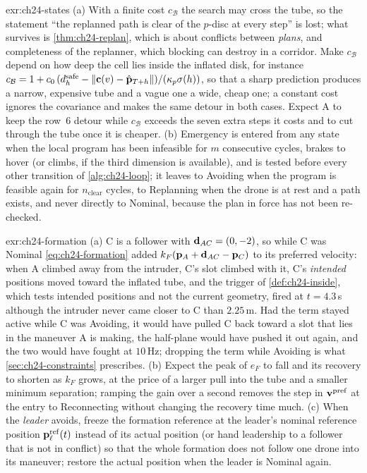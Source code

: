 \begin{solution}{exr:ch24-states}
(a) With a finite cost $c_{\mathcal{B}}$ the search may cross the tube, so the statement ``the replanned path is clear of the $p$-disc at every step'' is lost; what survives is \cref{thm:ch24-replan}, which is about conflicts between \emph{plans}, and completeness of the replanner, which blocking can destroy in a corridor. Make $c_{\mathcal{B}}$ depend on how deep the cell lies inside the inflated disk, for instance $c_{\mathcal{B}} = 1 + c_0\,(d^{\mathrm{safe}}_h - \left\lVert \mathbf{c}(v) - \hat{\mathbf{p}}_{T+h} \right\rVert)/(\kappa_p\sigma(h))$, so that a sharp prediction produces a narrow, expensive tube and a vague one a wide, cheap one; a constant cost ignores the covariance and makes the same detour in both cases. Expect A to keep the row~6 detour while $c_{\mathcal{B}}$ exceeds the seven extra steps it costs and to cut through the tube once it is cheaper. (b) Emergency is entered from any state when the local program has been infeasible for $m$ consecutive cycles, brakes to hover (or climbs, if the third dimension is available), and is tested before every other transition of \cref{alg:ch24-loop}; it leaves to Avoiding when the program is feasible again for $n_{\mathrm{clear}}$ cycles, to Replanning when the drone is at rest and a path exists, and never directly to Nominal, because the plan in force has not been re-checked.
\end{solution}

\begin{solution}{exr:ch24-formation}
(a) C is a follower with $\mathbf{d}_{AC} = (0,-2)$, so while C was Nominal \cref{eq:ch24-formation} added $k_F(\mathbf{p}_A + \mathbf{d}_{AC} - \mathbf{p}_C)$ to its preferred velocity: when A climbed away from the intruder, C's slot climbed with it, C's \emph{intended} positions moved toward the inflated tube, and the trigger of \cref{def:ch24-inside}, which tests intended positions and not the current geometry, fired at $t = 4.3$\,s although the intruder never came closer to C than $2.25$\,m. Had the term stayed active while C was Avoiding, it would have pulled C back toward a slot that lies in the maneuver A is making, the \orca half-plane would have pushed it out again, and the two would have fought at $10$\,Hz; dropping the term while Avoiding is what \cref{sec:ch24-constraints} prescribes. (b) Expect the peak of $e_F$ to fall and its recovery to shorten as $k_F$ grows, at the price of a larger pull into the tube and a smaller minimum separation; ramping the gain over a second removes the step in $\mathbf{v}^{\mathrm{pref}}$ at the entry to Reconnecting without changing the recovery time much. (c) When the \emph{leader} avoids, freeze the formation reference at the leader's nominal reference position $\mathbf{p}^{\mathrm{ref}}_\ell(t)$ instead of its actual position (or hand leadership to a follower that is not in conflict) so that the whole formation does not follow one drone into its maneuver; restore the actual position when the leader is Nominal again.
\end{solution}

